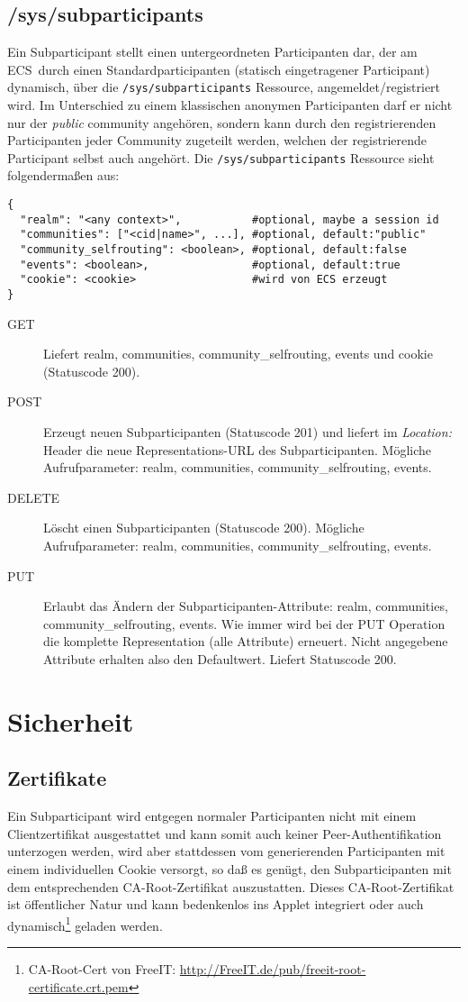 \documentclass[12pt,a4paper]{article}
\newcommand{\ecs}{ECS}
\begin{document}
\subsection{/sys/subparticipants}
Ein Subparticipant stellt einen untergeordneten Participanten dar, der am \ecs\
durch einen Standardparticipanten (statisch eingetragener Participant)
dynamisch, über die \texttt{/sys/subparticipants} Ressource,
angemeldet/registriert wird. Im Unterschied zu einem klassischen anonymen
Participanten darf er nicht nur der \textit{public} community angehören,
sondern kann durch den registrierenden Participanten jeder Community zugeteilt
werden, welchen der registrierende Participant selbst auch angehört. Die
\texttt{/sys/subparticipants} Ressource sieht folgendermaßen aus:
\begin{verbatim}
{
  "realm": "<any context>",           #optional, maybe a session id
  "communities": ["<cid|name>", ...], #optional, default:"public"
  "community_selfrouting": <boolean>, #optional, default:false
  "events": <boolean>,                #optional, default:true
  "cookie": <cookie>                  #wird von ECS erzeugt
}
\end{verbatim}

\begin{description}
  \item[GET] Liefert realm, communities, community\_selfrouting, events und cookie (Statuscode 200).
  \item[POST] Erzeugt neuen Subparticipanten (Statuscode 201) und liefert im \textit{Location:} Header die neue Representations-URL des Subparticipanten. Mögliche Aufrufparameter: realm, communities, community\_selfrouting, events.
  \item[DELETE] Löscht einen Subparticipanten (Statuscode 200). Mögliche Aufrufparameter: realm, communities, community\_selfrouting, events.
  \item[PUT] Erlaubt das Ändern der Subparticipanten-Attribute: realm, communities, community\_selfrouting, events. Wie immer wird bei der PUT Operation die komplette Representation (alle Attribute) erneuert. Nicht angegebene Attribute erhalten also den Defaultwert. Liefert Statuscode 200.
\end{description}

\section{Sicherheit}
\subsection{Zertifikate}
Ein Subparticipant wird entgegen normaler Participanten nicht mit einem
Clientzertifikat ausgestattet und kann somit auch keiner Peer-Authentifikation
unterzogen werden, wird aber stattdessen vom generierenden Participanten mit
einem individuellen Cookie versorgt, so daß es genügt, den Subparticipanten mit
dem entsprechenden CA-Root-Zertifikat auszustatten. Dieses CA-Root-Zertifikat
ist öffentlicher Natur und kann bedenkenlos ins Applet integriert oder auch
dynamisch\footnote{CA-Root-Cert von FreeIT:
\url{http://FreeIT.de/pub/freeit-root-certificate.crt.pem}} geladen werden.
\end{document}
